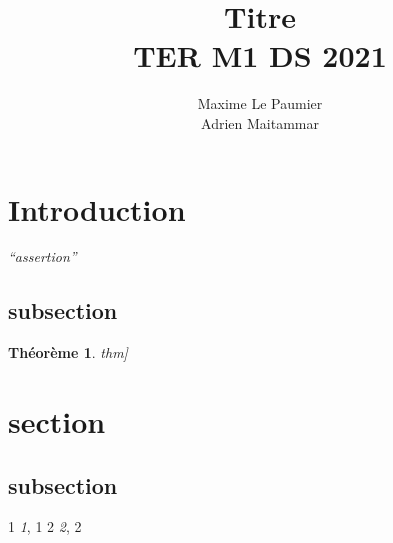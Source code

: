 \documentclass[a4paper]{article}
\title{\huge Titre\\[15pt] \small TER M1 DS 2021}
\author{Maxime Le Paumier \\ Adrien Maitammar}
\newtheorem{theorem}{Théorème}[subsection]
\theoremstyle{definition}
\begin{document}
\maketitle

\vspace{30pt}

\renewcommand{\contentsname}{Sommaire}
\tableofcontents
 \clearpage
 
\section{Introduction}

\vspace{5pt}

\textit{``assertion''}


\subsection{subsection}


\begin{theorem}thm]\label{thm}

\end{theorem}


\clearpage


\section{section}

\subsection{subsection}





\clearpage
%
\begin{thebibliography}{9}

1 {\em 1}, 1
2 {\em 2}, 2

\end{thebibliography}
\end{document}
